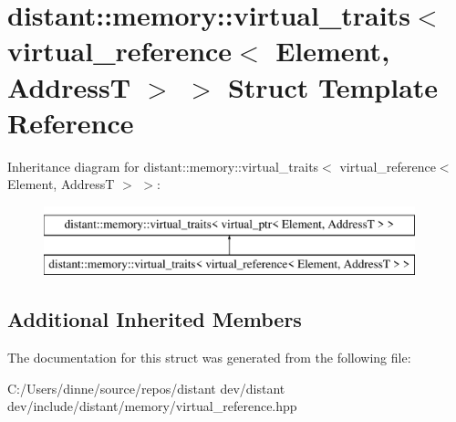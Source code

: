 \hypertarget{structdistant_1_1memory_1_1virtual__traits_3_01virtual__reference_3_01_element_00_01_address_t_01_4_01_4}{}\section{distant\+:\+:memory\+:\+:virtual\+\_\+traits$<$ virtual\+\_\+reference$<$ Element, AddressT $>$ $>$ Struct Template Reference}
\label{structdistant_1_1memory_1_1virtual__traits_3_01virtual__reference_3_01_element_00_01_address_t_01_4_01_4}
Inheritance diagram for distant\+:\+:memory\+:\+:virtual\+\_\+traits$<$ virtual\+\_\+reference$<$ Element, AddressT $>$ $>$\+:\begin{figure}[H]
\begin{center}
\leavevmode
\includegraphics[height=2.000000cm]{structdistant_1_1memory_1_1virtual__traits_3_01virtual__reference_3_01_element_00_01_address_t_01_4_01_4}
\end{center}
\end{figure}
\subsection*{Additional Inherited Members}


The documentation for this struct was generated from the following file\+:\begin{DoxyCompactItemize}
\item 
C\+:/\+Users/dinne/source/repos/distant dev/distant dev/include/distant/memory/virtual\+\_\+reference.\+hpp\end{DoxyCompactItemize}
